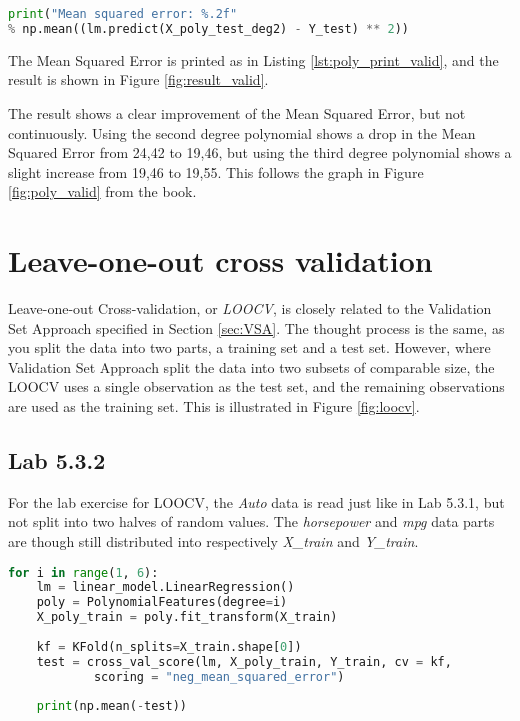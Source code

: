 \begin{lstlisting}[language=Python, label=lst:poly_print_valid, caption=Printing polynomial features with degree = 2]
print("Mean squared error: %.2f" 
% np.mean((lm.predict(X_poly_test_deg2) - Y_test) ** 2))
\end{lstlisting}

The Mean Squared Error is printed as in Listing \ref{lst:poly_print_valid}, and the result is shown in Figure \ref{fig:result_valid}.


The result shows a clear improvement of the Mean Squared Error, but not continuously. Using the second degree polynomial shows a drop in the Mean Squared Error from 24,42 to 19,46, but using the third degree polynomial shows a slight increase from 19,46 to 19,55. This follows the graph in Figure \ref{fig:poly_valid} from the book. 



\section{Leave-one-out cross validation}
Leave-one-out Cross-validation, or \emph{LOOCV}, is closely related to the Validation Set Approach specified in Section \ref{sec:VSA}. The thought process is the same, as you split the data into two parts, a training set and a test set. However, where Validation Set Approach split the data into two subsets of comparable size, the LOOCV uses a single observation as the test set, and the remaining observations are used as the training set. This is illustrated in Figure \ref{fig:loocv}. 


\subsection{Lab 5.3.2}
For the lab exercise for LOOCV, the \emph{Auto} data is read just like in Lab 5.3.1, but not split into two halves of random values. The \emph{horsepower} and \emph{mpg} data parts are though still distributed into respectively \emph{X\_train} and \emph{Y\_train}.

\begin{lstlisting}[language=Python, label=lst:LOOCV, caption=Leave-one-out Cross-validation loop]
for i in range(1, 6):
	lm = linear_model.LinearRegression()
	poly = PolynomialFeatures(degree=i)
	X_poly_train = poly.fit_transform(X_train)
	
	kf = KFold(n_splits=X_train.shape[0]) 
	test = cross_val_score(lm, X_poly_train, Y_train, cv = kf, 
			scoring = "neg_mean_squared_error")
	
	print(np.mean(-test))
\end{lstlisting}


